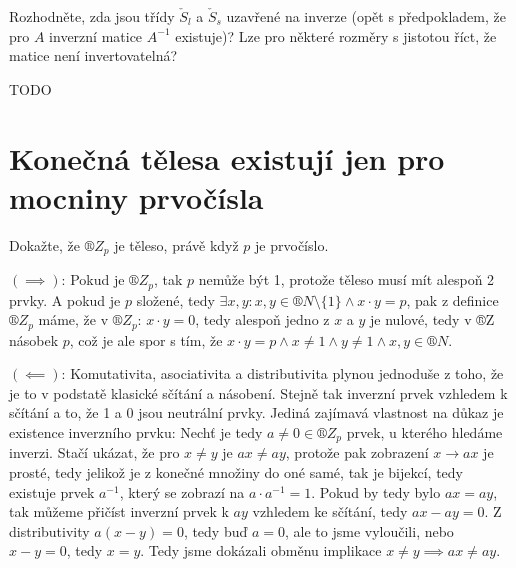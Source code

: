 \documentclass[12pt]{article}					%
\begin{document}
    \begin{priklad}[5.3]
        Rozhodněte, zda jsou třídy $\check S_l$ a $\check S_s$ uzavřené na inverze (opět s předpokladem, že pro $A$ inverzní matice $A^{-1}$ existuje)? Lze pro některé rozměry s jistotou říct, že matice není invertovatelná?

        \begin{reseni}
            TODO
        \end{reseni}
    \end{priklad}




\section{Konečná tělesa existují jen pro mocniny prvočísla}
    \begin{priklad}[6.1]
        Dokažte, že $®Z_p$ je těleso, právě když $p$ je prvočíslo.

        \begin{dukazin}
            $(\implies)$: Pokud je $®Z_p$, tak $p$ nemůže být 1, protože těleso musí mít alespoň 2 prvky. A pokud je $p$ složené, tedy $\exists x, y: x,y\in®N \setminus \{1\} \land x·y = p$, pak z definice $®Z_p$ máme, že v $®Z_p$: $x·y=0$, tedy alespoň jedno z $x$ a $y$ je nulové, tedy v ®Z násobek $p$, což je ale spor s tím, že $x·y = p \land x ≠ 1 \land y≠1 \land x, y \in ®N$.

            $(\impliedby)$: Komutativita, asociativita a distributivita plynou jednoduše z toho, že je to v podstatě klasické sčítání a násobení. Stejně tak inverzní prvek vzhledem k sčítání a to, že 1 a 0 jsou neutrální prvky. Jediná zajímavá vlastnost na důkaz je existence inverzního prvku: Nechť je tedy $a ≠ 0 \in ®Z_p$ prvek, u kterého hledáme inverzi. Stačí ukázat, že pro $x ≠ y$ je $ax ≠ ay$, protože pak zobrazení $x \rightarrow ax$ je prosté, tedy jelikož je z konečné množiny do oné samé, tak je bijekcí, tedy existuje prvek $a^{-1}$, který se zobrazí na $a·a^{-1} = 1$. Pokud by tedy bylo $ax = ay$, tak můžeme přičíst inverzní prvek k $ay$ vzhledem ke sčítání, tedy $ax - ay = 0$. Z distributivity $a(x-y) = 0$, tedy buď $a=0$, ale to jsme vyloučili, nebo $x-y = 0$, tedy $x = y$. Tedy jsme dokázali obměnu implikace $x≠y \implies ax ≠ ay$.
        \end{dukazin}
    \end{priklad}
\end{document}
